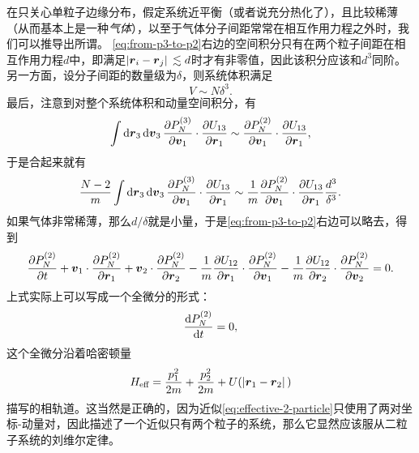 在只关心单粒子边缘分布，假定系统近平衡（或者说充分热化了），且比较稀薄（从而基本上是一种\emph{气体}），以至于气体分子间距常常在相互作用力程之外时，我们可以推导出所谓。
\eqref{eq:from-p3-to-p2}右边的空间积分只有在两个粒子间距在相互作用力程$d$中，即满足$\abs*{\vb*{r}_i - \vb*{r}_j} \lesssim d$时才有非零值，因此该积分应该和$d^3$同阶。另一方面，设分子间距的数量级为$\delta$，则系统体积满足
\[
    V \sim N \delta^3.
\]
最后，注意到对整个系统体积和动量空间积分，有
\[
    \int \dd{\vb*{r}_3} \dd{\vb*{v}_3} \pdv{P_N^{(3)}}{\vb*{v}_1} \cdot \pdv{U_{13}}{\vb*{r}_1} \sim \pdv{P_N^{(2)}}{\vb*{v}_1} \cdot \pdv{U_{13}}{\vb*{r}_1},
\]
于是合起来就有
\[
    \frac{N-2}{m} \int \dd{\vb*{r}_3} \dd{\vb*{v}_3} \pdv{P_N^{(3)}}{\vb*{v}_1} \cdot \pdv{U_{13}}{\vb*{r}_1} \sim \frac{1}{m} \pdv{P_N^{(2)}}{\vb*{v}_1} \cdot \pdv{U_{13}}{\vb*{r}_1} \frac{d^3}{\delta^3}.
\]
如果气体非常稀薄，那么$d/\delta$就是小量，于是\eqref{eq:from-p3-to-p2}右边可以略去，得到
\begin{equation}
    \pdv{P_N^{(2)}}{t} 
    + \vb*{v}_1 \cdot \pdv{P_N^{(2)}}{\vb*{r}_1} 
    + \vb*{v}_2 \cdot \pdv{P_N^{(2)}}{\vb*{r}_2} 
    - \frac{1}{m} \pdv{U_{12}}{\vb*{r}_1} \cdot \pdv{P_N^{(2)}}{\vb*{v}_1} 
    - \frac{1}{m} \pdv{U_{12}}{\vb*{r}_2} \cdot \pdv{P_N^{(2)}}{\vb*{v}_2} = 0.
    \label{eq:effective-2-particle}
\end{equation}
上式实际上可以写成一个全微分的形式：
\begin{equation}
    \dv{P_N^{(2)}}{t}=0,
    \label{eq:pn2-constant}
\end{equation}
这个全微分沿着哈密顿量
\begin{equation}
    H_\text{eff} = \frac{p_1^2}{2m} + \frac{p_2^2}{2m} + U(\abs*{\vb*{r}_1 - \vb*{r}_2})
    \label{eq:2-particle-hamiltonian}
\end{equation}
描写的相轨道。这当然是正确的，因为近似\eqref{eq:effective-2-particle}只使用了两对坐标-动量对，因此描述了一个近似只有两个粒子的系统，那么它显然应该服从二粒子系统的刘维尔定律。

